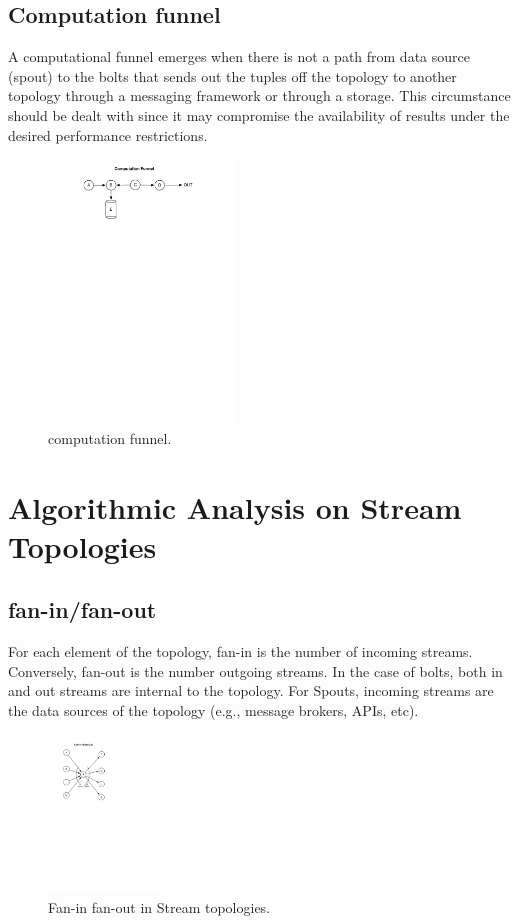 \subsection{Computation funnel}
A computational funnel emerges when there is not a path from data source (spout) to the bolts that sends out the tuples off the topology to another topology through a messaging framework or through a storage. This circumstance should be dealt with since it may compromise the availability of results under the desired performance restrictions.

\begin{figure}[H]
	\begin{center}
		\includegraphics[width=5cm]{images/funnel}
		\caption{computation funnel.}
		\label{fig:funnel}
	\end{center}
\end{figure}

\section{Algorithmic Analysis on Stream Topologies}\label{algo}

\subsection{fan-in/fan-out}

For each element of the topology, fan-in is the number of incoming
streams. Conversely, fan-out is the number outgoing streams. In the case of
bolts, both in and out streams are internal to the topology. For Spouts,
incoming streams are the data sources of the topology (e.g., message brokers,
APIs, etc).

\begin{figure}[H]
	\begin{center}
		\includegraphics[width=3cm]{images/fan-in-out}
		\caption{Fan-in fan-out in Stream topologies.}
		\label{fig:fan}
	\end{center}
\end{figure}

